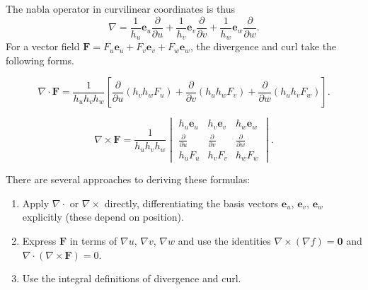 \documentclass[a4paper]{article}
\begin{document}
The nabla operator in curvilinear coordinates is thus
\[
  \nabla = \frac{1}{h_u}\mathbf{e}_u \frac{\partial }{\partial u} + \frac{1}{h_v}\mathbf{e}_v\frac{\partial }{\partial v} + \frac{1}{h_w}\mathbf{e}_w \frac{\partial}{\partial w}.
\]
For a vector field $\mathbf{F} = F_u \mathbf{e}_u + F_v \mathbf{e}_v + F_w \mathbf{e}_w$, the divergence and curl take the following forms.

\begin{prop}
  \[
    \nabla\cdot \mathbf{F} = \frac{1}{h_uh_vh_w}\left[\frac{\partial}{\partial u}(h_vh_wF_u) + \frac{\partial}{\partial v}(h_uh_wF_v) + \frac{\partial}{\partial w}(h_uh_vF_w)\right].
  \]
\end{prop}

\begin{prop}
  \[
    \nabla \times \mathbf{F} = \frac{1}{h_uh_vh_w}
    \begin{vmatrix} h_u\mathbf{e}_u & h_v\mathbf{e}_v & h_w \mathbf{e}_w\\
      \frac{\partial}{\partial u} & \frac{\partial}{\partial v} & \frac{\partial}{\partial w}\\
      h_u F_u & h_v F_v & h_wF_w
    \end{vmatrix}.
  \]
\end{prop}

\begin{rmk}
  There are several approaches to deriving these formulas:
  \begin{enumerate}
    \item Apply $\nabla\cdot$ or $\nabla\times$ directly, differentiating the basis vectors $\mathbf{e}_u$, $\mathbf{e}_v$, $\mathbf{e}_w$ explicitly (these depend on position).
    \item Express $\mathbf{F}$ in terms of $\nabla u$, $\nabla v$, $\nabla w$ and use the identities $\nabla\times (\nabla f) = \mathbf{0}$ and $\nabla\cdot (\nabla\times \mathbf{F}) = 0$.
    \item Use the integral definitions of divergence and curl.
  \end{enumerate}
\end{rmk}
\end{document}
